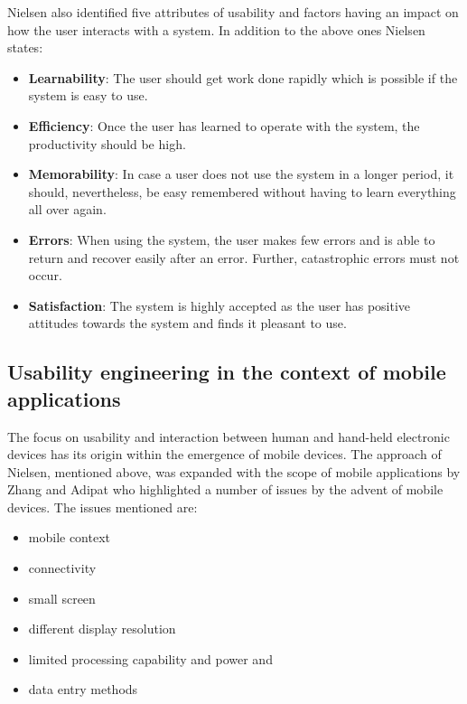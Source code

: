 Nielsen \cite{nielsen1994usability} also identified five attributes of usability and factors having an impact on how the user interacts with a system. In addition to the above ones Nielsen \cite{nielsen1994} states:

\begin{itemize}
	
	\item \textbf{Learnability}: The user should get work done rapidly which is possible if the system is easy to use.
	\item \textbf{Efficiency}: Once the user has learned to operate with the system, the productivity should be high.
	\item \textbf{Memorability}: In case a user does not use the system in a longer period, it should, nevertheless, be easy remembered without having to learn everything all over again.	
	\item \textbf{Errors}: When using the system, the user makes few errors and is able to return and recover easily after an error. Further, catastrophic errors must not occur.
	\item \textbf{Satisfaction}: The system is highly accepted as the user has positive attitudes towards the system and finds it pleasant to use.
\end{itemize}


\subsection{Usability engineering in the context of mobile applications}

The focus on usability and interaction between human and hand-held electronic devices has its origin within the emergence of mobile devices. The approach of Nielsen, mentioned above, was expanded with the scope of mobile applications by Zhang and Adipat \cite{zhang2005challenges} who highlighted a number of issues by the advent of mobile devices. The issues mentioned are:
\begin{itemize}
	
	\item mobile context
	\item connectivity
	\item small screen
	\item different display resolution
	\item limited processing capability and power and
	\item data entry methods
	
\end{itemize}

